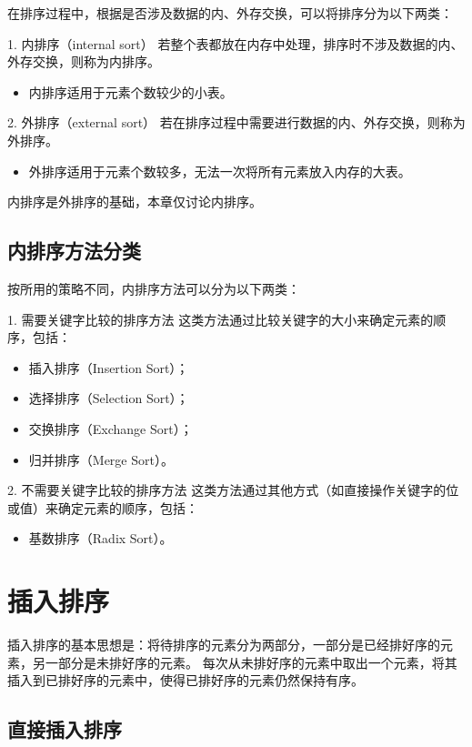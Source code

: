 \documentclass[lang=cn,newtx,10pt,scheme=chinese]{../elegantbook}
\begin{document}
在排序过程中，根据是否涉及数据的内、外存交换，可以将排序分为以下两类：

1. 内排序（internal sort）  
   若整个表都放在内存中处理，排序时不涉及数据的内、外存交换，则称为内排序。  
   \begin{itemize}
     \item 内排序适用于元素个数较少的小表。
   \end{itemize}

2. 外排序（external sort）  
   若在排序过程中需要进行数据的内、外存交换，则称为外排序。  
   \begin{itemize}
     \item 外排序适用于元素个数较多，无法一次将所有元素放入内存的大表。
   \end{itemize}

内排序是外排序的基础，本章仅讨论内排序。


\subsection{内排序方法分类}

按所用的策略不同，内排序方法可以分为以下两类：

1. 需要关键字比较的排序方法  
   这类方法通过比较关键字的大小来确定元素的顺序，包括：
   \begin{itemize}
     \item 插入排序（Insertion Sort）；
     \item 选择排序（Selection Sort）；
     \item 交换排序（Exchange Sort）；
     \item 归并排序（Merge Sort）。
   \end{itemize}

2. 不需要关键字比较的排序方法  
   这类方法通过其他方式（如直接操作关键字的位或值）来确定元素的顺序，包括：
   \begin{itemize}
     \item 基数排序（Radix Sort）。
   \end{itemize}
\section{插入排序}
插入排序的基本思想是：将待排序的元素分为两部分，一部分是已经排好序的元素，另一部分是未排好序的元素。
每次从未排好序的元素中取出一个元素，将其插入到已排好序的元素中，使得已排好序的元素仍然保持有序。
\subsection{直接插入排序}
\end{document}
